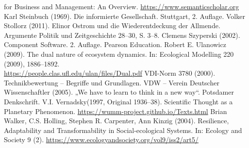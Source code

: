 \documentclass[11pt,a4paper]{article}
\begin{document}
\begin{thebibliography}{xxx}
  for Business and Management: An Overview.
  \url{https://www.semanticscholar.org}
 Karl Steinbuch (1969). Die informierte Gesellschaft.
  Stuttgart, 2. Auflage.
 Volker Stollorz (2011). Elinor Ostrom und die
  Wiederentdeckung der Allmende. Argumente Politik und Zeitgeschichte 28--30,
  S. 3--8.
 Clemens Szyperski (2002). Component Software.
  2. Auf\-lage.  Pearson Education.
 Robert E. Ulanowicz (2009). The dual nature of
  ecosystem dynamics.  In: Ecological Modelling 220 (2009),
  1886–1892.\\ \url{https://people.clas.ufl.edu/ulan/files/Dual.pdf}
 VDI-Norm 3780 (2000). Technikbewertung -- Begriffe und
  Grundlagen.  
 VDW -- Verein Deutscher Wissenschaftler (2005). „We have to
  learn to think in a new way“. Potsdamer Denkschrift.
 V.I. Vernadsky(1997, Original 1936--38). Scientific
  Thought as a Planetary Phenomenon.
  \url{https://wumm-project.github.io/Texts.html}
 Brian Walker, C.S. Holling, Stephen R. Carpenter, Ann
  Kinzig (2004).  Resilience, Adaptability and Transformability in
  Social-ecological Systems.  In: Ecology and Society 9 (2).
  \url{https://www.ecologyandsociety.org/vol9/iss2/art5/}
\end{thebibliography}
\end{document}
